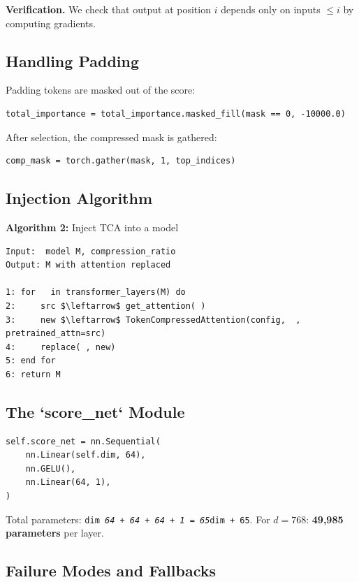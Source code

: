 \textbf{Verification.} We check that output at position $i$ depends only on 
inputs $\leq i$ by computing gradients.

\subsection{Handling Padding}

Padding tokens are masked out of the score:

\begin{lstlisting}
total_importance = total_importance.masked_fill(mask == 0, -10000.0)
\end{lstlisting}

After selection, the compressed mask is gathered:

\begin{lstlisting}
comp_mask = torch.gather(mask, 1, top_indices)
\end{lstlisting}

\subsection{Injection Algorithm}

\textbf{Algorithm 2:} Inject TCA into a model
\begin{lstlisting}
Input:  model M, compression_ratio  
Output: M with attention replaced

1: for   in transformer_layers(M) do
2:     src $\leftarrow$ get_attention( )
3:     new $\leftarrow$ TokenCompressedAttention(config,  , pretrained_attn=src)
4:     replace( , new)
5: end for
6: return M
\end{lstlisting}

\subsection{The `score\_net` Module}

\begin{lstlisting}
self.score_net = nn.Sequential(
    nn.Linear(self.dim, 64),
    nn.GELU(),
    nn.Linear(64, 1),
)
\end{lstlisting}

Total parameters: \texttt{dim \textit{ 64 + 64 + 64 + 1 = 65}dim + 65}. For $d = 768$: 
\textbf{49,985 parameters} per layer.

\subsection{Failure Modes and Fallbacks}

